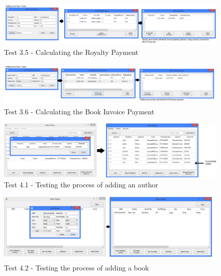 \begin{landscape}
\begin{figure}[H]
    \includegraphics[width=\textwidth]{./Testing/Evidence/Series3/RoyaltyPaymentValidation.png}
    \caption{Test 3.5 - Calculating the Royalty Payment}  \label{fig:RoyaltyPaymentValidation}
\end{figure}

\begin{figure}[H]
    \includegraphics[width=\textwidth]{./Testing/Evidence/Series3/BookInvoicePaymentValidation.png}
    \caption{Test 3.6 - Calculating the Book Invoice Payment}  \label{fig:BookInvoicePaymentValidation}
\end{figure}

\begin{figure}[H]
    \includegraphics[width=\textwidth]{./Testing/Evidence/Series4/AddAuthorTest.png}
    \caption{Test 4.1 - Testing the process of adding an author}  \label{fig:AddAuthorTest}
\end{figure}

\begin{figure}[H]
    \includegraphics[width=\textwidth]{./Testing/Evidence/Series4/AddBookTest.png}
    \caption{Test 4.2 - Testing the process of adding a book}  \label{fig:AddBookTest}
\end{figure}


\end{landscape}
